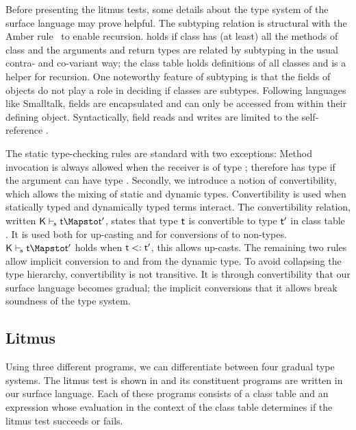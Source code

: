 \documentclass[USenglish]{tex/lipics-v2016}f
\begin{document}
Before presenting the litmus tests, some details about the type system of the
surface language may prove helpful. The subtyping relation is structural
with the Amber rule~\cite{cardelli1985amber} to enable recursion. \StrSub\M\K\C\D holds if class
\C has (at least) all the methods of class \D and the arguments and return
types are related by subtyping in the usual contra- and co-variant way; the
class table \K holds definitions of all classes and \M is a helper for
recursion. One noteworthy feature of subtyping is that the fields of objects
do not play a role in deciding if classes are subtypes. Following languages
like Smalltalk, fields are encapsulated and can only be accessed from within their
defining object. Syntactically, field reads and writes are limited to
the self-reference \this. 

The static type-checking rules are standard with two exceptions:
Method invocation is always allowed when the receiver \e is of 
type \any; therefore  has type \any if the argument
can have type \any. Secondly, we introduce a notion of convertibility, 
which allows the mixing of static and dynamic types. 
Convertibility is used when statically typed and dynamically typed terms
interact. The convertibility relation, written $\ConvertE\K s\t\tp$, states
that type $\t$ is convertible to type $\tp$ in class table \K.  It
is used both for up-casting and for conversions of \any to non-\any types.
$\ConvertE\K s\t\tp$ holds when $\t\Sub\tp$, this allows up-casts. The
remaining two rules allow implicit conversion to and from the dynamic type.
To avoid collapsing the type hierarchy, convertibility is not transitive.
It is through convertibility that our surface language becomes gradual; the
implicit conversions that it allows break soundness of the type system.


\subsection{Litmus}

Using three different programs, we can differentiate between four gradual
type systems. The litmus test is shown in  and its
constituent programs are written in our surface language.  Each of these
programs consists of a class table and an expression whose evaluation in
the context of the class table determines if the litmus test succeeds or
fails.
\end{document}
